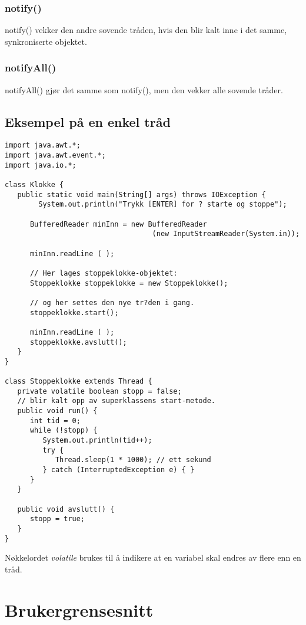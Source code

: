 \documentclass[11pt]{article}
\begin{document}
\subsubsection{notify()}
\label{sec-18-4-2}


notify() vekker den andre sovende tråden, hvis den blir kalt inne i
det samme, synkroniserte objektet.
\subsubsection{notifyAll()}
\label{sec-18-4-3}


notifyAll() gjør det samme som notify(), men den vekker alle sovende tråder.
\subsection{Eksempel på en enkel tråd}
\label{sec-18-5}



\begin{verbatim}
import java.awt.*;
import java.awt.event.*;
import java.io.*;

class Klokke {
   public static void main(String[] args) throws IOException {
        System.out.println("Trykk [ENTER] for ? starte og stoppe");

      BufferedReader minInn = new BufferedReader
                                   (new InputStreamReader(System.in));

      minInn.readLine ( );

      // Her lages stoppeklokke-objektet:
      Stoppeklokke stoppeklokke = new Stoppeklokke();

      // og her settes den nye tr?den i gang.
      stoppeklokke.start();

      minInn.readLine ( );
      stoppeklokke.avslutt();
   }
}

class Stoppeklokke extends Thread {
   private volatile boolean stopp = false;
   // blir kalt opp av superklassens start-metode.
   public void run() {
      int tid = 0;
      while (!stopp) {
         System.out.println(tid++);
         try {
            Thread.sleep(1 * 1000); // ett sekund
         } catch (InterruptedException e) { }
      }
   }

   public void avslutt() {
      stopp = true;
   }
}
\end{verbatim}

Nøkkelordet \emph{volatile} brukes til å indikere at en variabel skal
endres av flere enn en tråd.
\section{Brukergrensesnitt}
\label{sec-19}
\end{document}

